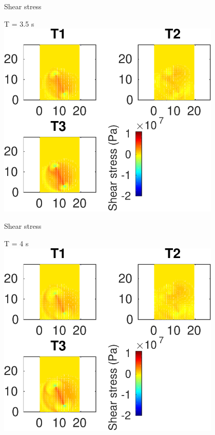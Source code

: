 \documentclass{beamer}
\begin{document}
\begin{frame}
 {Shear stress}
 
 \centering \Large T = 3.5 s\\
 \includegraphics[width=0.8\textwidth]{images/horizontal_00041}
 
\end{frame}

\begin{frame}
 {Shear stress}
 
 \centering \Large T = 4 s\\
 \includegraphics[width=0.8\textwidth]{images/horizontal_00046}
 
\end{frame}
\end{document}
